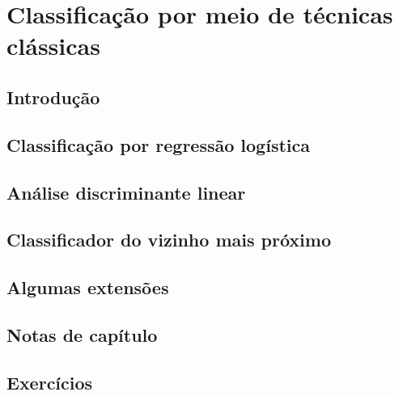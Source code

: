 \documentclass[
]{latex/krantz}
\theoremstyle{definition}
\theoremstyle{definition}
\theoremstyle{definition}
\theoremstyle{definition}
\theoremstyle{remark}
\begin{document}
\hypertarget{classificauxe7uxe3o-por-meio-de-tuxe9cnicas-cluxe1ssicas}{%
\chapter{Classificação por meio de técnicas clássicas}\label{classificauxe7uxe3o-por-meio-de-tuxe9cnicas-cluxe1ssicas}}

\hypertarget{introduuxe7uxe3o-7}{%
\section{Introdução}\label{introduuxe7uxe3o-7}}

\hypertarget{classificauxe7uxe3o-por-regressuxe3o-loguxedstica}{%
\section{Classificação por regressão logística}\label{classificauxe7uxe3o-por-regressuxe3o-loguxedstica}}

\hypertarget{anuxe1lise-discriminante-linear}{%
\section{Análise discriminante linear}\label{anuxe1lise-discriminante-linear}}

\hypertarget{classificador-do-vizinho-mais-pruxf3ximo}{%
\section{Classificador do vizinho mais próximo}\label{classificador-do-vizinho-mais-pruxf3ximo}}

\hypertarget{algumas-extensuxf5es}{%
\section{Algumas extensões}\label{algumas-extensuxf5es}}

\hypertarget{notas-de-capuxedtulo-7}{%
\section{Notas de capítulo}\label{notas-de-capuxedtulo-7}}

\hypertarget{exercuxedcios-7}{%
\section{Exercícios}\label{exercuxedcios-7}}
\end{document}
